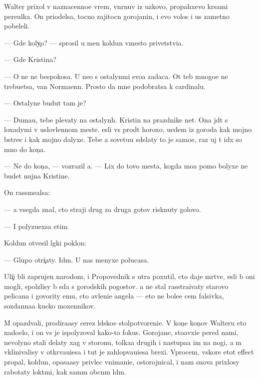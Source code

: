 \documentclass[10pt]{book}
\begin{document}
Walter prixol v naznacenno{\y}e vrem{\ia}, v{\yi}n{\yi}rnuv iz uzkovo, propahxevo kr{\yi}sami pereulka. On priodelsa, tocno zajitocn{\yi}{\y} gorojanin, i {\y}evo volos{\yi} i us{\yi} zametno pobeleli.

— Gde koly{\c}o? — sprosil u men{\ia} koldun vmesto privetstvi{\y}a.

— Gde Kristina?

— O ne{\y} ne bespoko{\y}sa. U ne{\y}o s ostalyn{\yi}mi svo{\y}a zadaca. Ot teb{\ia} mnogo{\y}e ne trebu{\y}etsa, van Normaenn. Prosto da{\y} mne podobratsa k cardinalu.

— Ostalyn{\yi}{\y}e budut tam je?

— Duma{\y}u, tebe plevaty na ostalyn{\yi}h. Kristin{\yi} na prazdnike net. Ona jd{\e}t s loxadymi v uslovlennom meste. {\Y}esli vs{\e} pro{\y}d{\e}t horoxo, u{\y}edem iz goroda kak mojno b{\yi}stre{\y}e i kak mojno dalyxe. Tebe {\y}a sovetu{\y}u sdelaty to je samo{\y}e, raz uj t{\yi} id{\e}x so mno{\y} do kon{\c}a.

— Ne do kon{\c}a, — vozrazil {\y}a. — Lix do tovo mesta, kogda mo{\y}a pomo{\x} bolyxe ne budet nujna Kristine.

On rassme{\y}alsa:

— {\Y}a vsegda znal, cto straji drug za druga gotov{\yi} risknuty golovo{\y}.

— I polyzu{\y}exsa etim.

Koldun otvesil l{\e}gki{\y} poklon:

— Glupo otri{\c}aty. Id{\e}m. U nas menyxe polucasa.

Uli{\c}i b{\yi}li zaprujen{\yi} narodom, i Propovednik s utra poxutil, cto daje m{\e}rtv{\yi}{\y}e, {\y}esli b{\yi} oni mogli, spolzlisy b{\yi} s{\io}da s gorodskih pogostov. {\Y}a ne stal rasstra{\y}ivaty starovo pelicana i govority {\y}emu, cto {\y}avleni{\y}e angela — eto ne bole{\y}e cem falsivka, sozdanna{\y}a kucko{\y} moxennikov.

M{\yi} opazd{\yi}vali, prodira{\y}asy cerez l{\io}dsko{\y}e stolpotvoreni{\y}e. V kon{\c}e kon{\c}ov Walteru eto nado{\y}elo, i on vs{\e} je ispolyzoval kako{\y}-to fokus. Gorojane, sto{\y}avxi{\y}e pered nami, nevolyno stali delaty xag v storonu, tolka{\y}a drugih i nastupa{\y}a im na nogi, a m{\yi} vklinivalisy v otkr{\yi}va{\y}u{\x}i{\y}esa i tut je zahlop{\yi}va{\y}u{\x}i{\y}esa brexi. Vprocem, vskore etot effect propal, koldun, opasa{\y}asy privlec vnimani{\y}e, ostorojnical, i nam snova prixlosy rabotaty lokt{\ia}mi, kak sam{\yi}m ob{\yi}cn{\yi}m l{\io}d{\ia}m.
\end{document}
